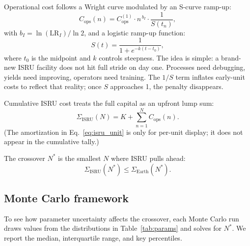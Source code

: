 \documentclass[preprint,12pt]{elsarticle}
\begin{document}
Operational cost follows a Wright curve modulated by an S-curve ramp-up:
\begin{equation}
  C_{\mathrm{ops}}(n) = C_{\mathrm{ops}}^{(1)} \cdot n^{\,b_I} \cdot \frac{1}{S(t_n)},
  \label{eq:isru_ops}
\end{equation}
with $b_I = \ln(\mathrm{LR}_I)/\ln 2$, and a logistic ramp-up function:
\begin{equation}
  S(t) = \frac{1}{1 + e^{-k(t - t_0)}},
  \label{eq:scurve}
\end{equation}
where $t_0$ is the midpoint and $k$ controls steepness. The idea is simple: a brand-new ISRU facility does not hit full stride on day one. Processes need debugging, yields need improving, operators need training. The $1/S$ term inflates early-unit costs to reflect that reality; once $S$ approaches 1, the penalty disappears.

Cumulative ISRU cost treats the full capital as an upfront lump sum:
\begin{equation}
  \Sigma_{\mathrm{ISRU}}(N) = K + \sum_{n=1}^{N} C_{\mathrm{ops}}(n).
  \label{eq:isru_cum}
\end{equation}
(The amortization in Eq.~\ref{eq:isru_unit} is only for per-unit display; it does not appear in the cumulative tally.)

The crossover $N^*$ is the smallest $N$ where ISRU pulls ahead:
\begin{equation}
  \Sigma_{\mathrm{ISRU}}(N^*) \leq \Sigma_{\mathrm{Earth}}(N^*).
  \label{eq:crossover}
\end{equation}

\subsection{Monte Carlo framework}

To see how parameter uncertainty affects the crossover, each Monte Carlo run draws values from the distributions in Table~\ref{tab:params} and solves for $N^*$. We report the median, interquartile range, and key percentiles.
\end{document}

